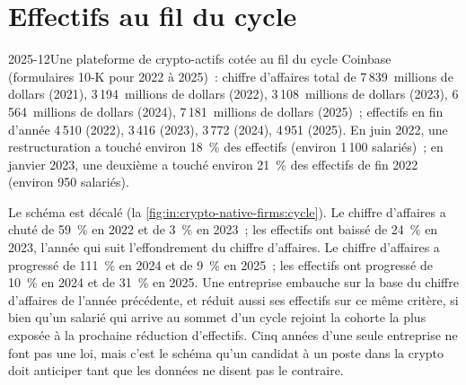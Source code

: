 \section{Effectifs au fil du cycle}

\begin{dated}{2025-12}{Une plateforme de crypto-actifs cotée au fil du cycle}\label{dat:in:crypto-native-firms:coinbase}
Coinbase (formulaires 10-K pour 2022 à 2025)~: chiffre d'affaires total de 7\,839~millions de dollars (2021), 3\,194~millions de dollars (2022), 3\,108~millions de dollars
(2023), 6\,564~millions de dollars (2024), 7\,181~millions de dollars (2025)~; effectifs en fin d'année 4\,510 (2022), 3\,416 (2023), 3\,772 (2024),
4\,951 (2025). En juin 2022, une restructuration a touché environ 18~\% des effectifs (environ 1\,100 salariés)~; en janvier 2023, une
deuxième a touché environ 21~\% des effectifs de fin 2022 (environ 950 salariés).
\end{dated}

Le schéma est décalé (la \cref{fig:in:crypto-native-firms:cycle}). Le chiffre d'affaires a chuté de 59~\% en 2022 et de 3~\% en 2023~; les effectifs
ont baissé de 24~\% en 2023, l'année qui suit l'effondrement du chiffre d'affaires. Le chiffre d'affaires a progressé de 111~\% en 2024 et de 9~\% en 2025~; les effectifs ont progressé de 10~\% en
2024 et de 31~\% en 2025. Une entreprise embauche sur la base du chiffre d'affaires de l'année précédente, et réduit aussi ses effectifs sur ce même critère, si bien qu'un salarié qui arrive au sommet d'un cycle
rejoint la cohorte la plus exposée à la prochaine réduction d'effectifs. Cinq années d'une seule entreprise ne font pas une loi, mais c'est le schéma qu'un candidat à un poste dans la crypto
doit anticiper tant que les données ne disent pas le contraire.

